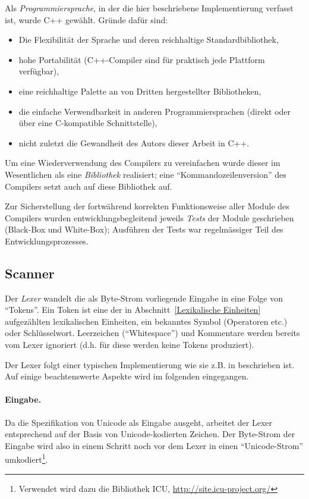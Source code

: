 \documentclass[twoside,a4paper,fleqn,12pt]{article}
\begin{document}
Als \emph{Programmiersprache}, in der die hier beschriebene Implementierung verfasst ist, wurde C++ gewählt.
Gründe dafür sind:
\begin{itemize}
\item Die Flexibilität der Sprache und deren reichhaltige Standardbibliothek,
\item hohe Portabilität (C++-Compiler sind für praktisch jede Plattform verfügbar),
\item eine reichhaltige Palette an von Dritten hergestellter Bibliotheken,
\item die einfache Verwendbarkeit in anderen Programmiersprachen (direkt oder über eine C-kompatible Schnittstelle),
\item nicht zuletzt die Gewandheit des Autors dieser Arbeit in C++.
\end{itemize}
 
Um eine Wiederverwendung des Compilers zu vereinfachen wurde dieser im Wesentlichen als eine \emph{Bibliothek} realisiert;
eine "`Kommandozeilenversion"' des Compilers setzt auch auf diese Bibliothek auf.
 
Zur Sicherstellung der fortwährend korrekten Funktionsweise aller Module des Compilers wurden entwicklungsbegleitend 
jeweils \emph{Tests} der Module geschrieben (Black-Box und White-Box); Ausführen der Tests war regelmässiger Teil des Entwicklungsprozesses.
 
\subsection{Scanner}

Der \emph{Lexer} wandelt die als Byte-Strom vorliegende Eingabe in eine Folge von "`Tokens"'.
Ein Token ist eine der in Abschnitt~\ref{Lexikalische Einheiten} aufgezählten lexikalischen Einheiten, ein bekanntes Symbol (Operatoren etc.) oder Schlüsselwort. 
Leerzeichen (``Whitespace'') und Kommentare werden bereits vom Lexer ignoriert (d.h. für diese werden keine Tokens produziert).

Der Lexer folgt einer typischen Implementierung wie sie z.B. in \cite{wirth_compiler} beschrieben ist. Auf einige beachtenswerte Aspekte
wird im folgenden eingegangen.

\paragraph{Eingabe.} Da die Spezifikation von Unicode als Eingabe ausgeht, arbeitet der Lexer entsprechend auf der Basis von Unicode-kodierten Zeichen.
Der Byte-Strom der Eingabe wird also in einem Schritt noch vor dem Lexer in einen "`Unicode-Strom"' umkodiert\footnote{Verwendet wird dazu die Bibliothek ICU,
\url{http://site.icu-project.org/}}.
\end{document}
